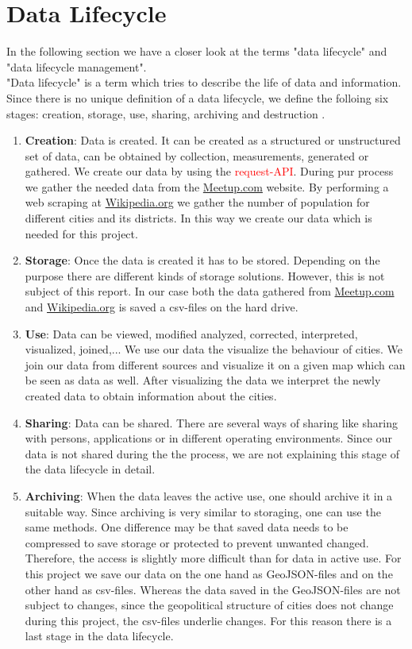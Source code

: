 \section{Data Lifecycle}\label{sec:datalifecycle}


In the following section we have a closer look at the terms "data lifecycle" and "data lifecycle management".\\"Data lifecycle" is a term which tries to describe the life of data and information. Since there is no unique definition of a data lifecycle, we define the folloing six stages: creation, storage, use, sharing, archiving and destruction \cite{spirion}.

\begin{enumerate}
	\item \textbf{Creation}: Data is created. It can be created as a structured or unstructured set of data, can be obtained by collection, measurements, generated or gathered. We create our data by using the \textcolor{red}{request-API}. During pur process we gather the needed data from the \url{Meetup.com} website. By performing a web scraping at \url{Wikipedia.org} we gather the number of population for different cities and its districts. In this way we create our data which is needed for this project.
	\item \textbf{Storage}: Once the data is created it has to be stored. Depending on the purpose there are different kinds of storage solutions. However, this is not subject of this report. In our case both the data gathered from \url{Meetup.com} and \url{Wikipedia.org} is saved a csv-files on the hard drive.
	\item \textbf{Use}: Data can be viewed, modified analyzed, corrected, interpreted, visualized, joined,... We use our data the visualize the behaviour of cities. We join our data from different sources and visualize it on a given map which can be seen as data as well. After visualizing the data we interpret the newly created data to obtain information about the cities.
	\item \textbf{Sharing}: Data can be shared. There are several ways of sharing like sharing with persons, applications or in different operating environments. Since our data is not shared during the the process, we are not explaining this stage of the data lifecycle in detail.
	\item \textbf{Archiving}: When the data leaves the active use, one should archive it in a suitable way. Since archiving is very similar to storaging, one can use the same methods. One difference may be that saved data needs to be compressed to save storage or protected to prevent unwanted changed. Therefore, the access is slightly more difficult than for data in active use. For this project we save our data on the one hand as GeoJSON-files and on the other hand as csv-files. Whereas the data saved in the GeoJSON-files are not subject to changes, since the geopolitical structure of cities does not change during this project, the csv-files underlie changes. For this reason there is a last stage in the data lifecycle.

\end{enumerate}
